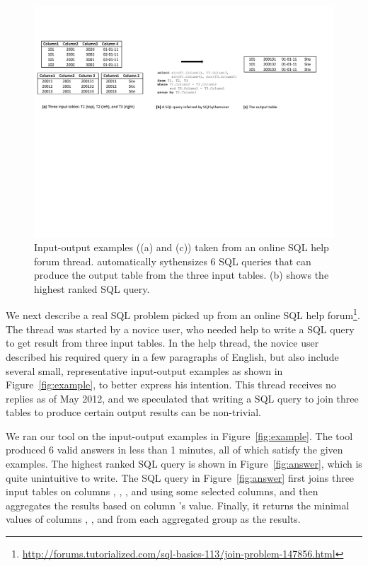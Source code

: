 

\begin{figure}[t]
  \centering
  \includegraphics[scale=0.70]{example2}
  \vspace*{-1.0ex}\caption {{\label{fig:example2} Input-output
  examples ((a) and (c)) taken from an online SQL help forum
  thread. \ourtool automatically sythensizes 6 SQL queries that
  can produce the output table from the three input tables.
  (b) shows the highest ranked SQL query.
}}
\end{figure}

We next describe a real SQL problem picked up from
an online SQL help forum\footnote{\url{http://forums.tutorialized.com/sql-basics-113/join-problem-147856.html}}.
The thread was started by a novice user, who needed help to write a
SQL query to get result from three input tables. In the help thread, the
novice user described his required query in a few paragraphs of
English, but also include several small, representative input-output
examples as shown in Figure~\ref{fig:example}, to better express
his intention. 
This thread receives no replies as of May 2012, and we speculated that
writing a SQL query to join three tables to produce certain output results
can be non-trivial.

We ran our tool on the input-output examples
in Figure~\ref{fig:example}. The tool produced 6 valid answers
in less than 1 minutes, all of which satisfy the given examples. The
highest ranked SQL query is shown in Figure~\ref{fig:answer},
which is quite unintuitive to write. The SQL query in Figure~\ref{fig:answer}
first joins three input tables
on columns , ,
, and  using some
selected columns, and then aggregates the results based on
column 's value. Finally, it
returns the minimal values of columns , , and 
from each aggregated group as the results.


